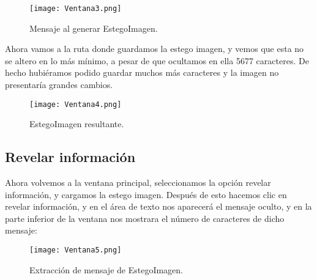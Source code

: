 \documentclass[a4paper]{article}
\begin{document}
\begin{figure}[htpb]
\centering
\texttt{[image: Ventana3.png]}
\caption{\label{fig:ventana3}Mensaje al generar EstegoImagen.}
\end{figure}

Ahora vamos a la ruta donde guardamos la estego imagen, y vemos que esta no se altero en lo más mínimo, a pesar de que ocultamos en ella 5677 caracteres. De hecho hubiéramos podido guardar muchos más caracteres y la imagen no presentaría grandes cambios.

\begin{figure}[htpb]
\centering
\texttt{[image: Ventana4.png]}
\caption{\label{fig:ventana4}EstegoImagen resultante.}
\end{figure}


\subsection{Revelar información}

Ahora volvemos a la ventana principal, seleccionamos la opción revelar información, y cargamos la estego imagen. Después de esto hacemos clic en revelar información, y en el área de texto nos aparecerá el mensaje oculto, y en la parte inferior de la ventana nos mostrara el número de caracteres de dicho mensaje:

\begin{figure}[htpb]
\centering
\texttt{[image: Ventana5.png]}
\caption{\label{fig:inverso}Extracción de mensaje de EstegoImagen.}
\end{figure}

\newpage
\end{document}
